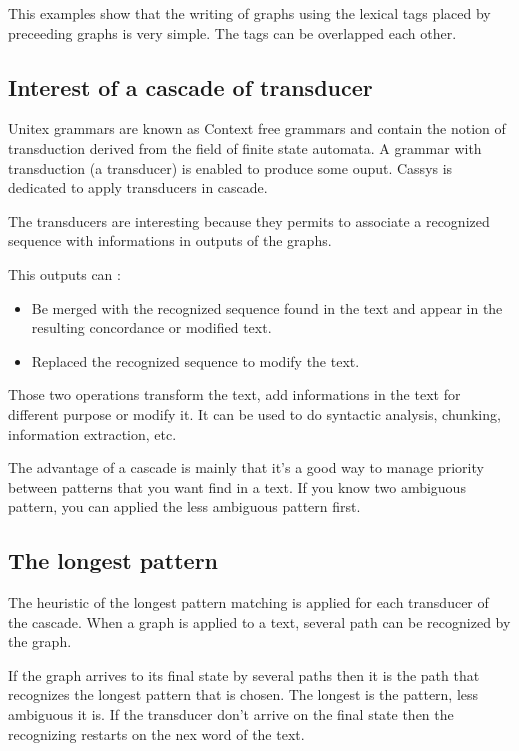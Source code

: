 \bigskip
\noindent This examples show that the writing of graphs using the lexical tags placed by preceeding graphs is very simple. The tags can be overlapped each other.

\subsection{Interest of a cascade of transducer}

Unitex grammars are known as Context free grammars and contain the notion of transduction derived from the field 
of finite state automata. A grammar with transduction (a transducer) is enabled to produce some ouput. 
Cassys is dedicated to apply transducers in cascade.

\bigskip
\noindent The transducers are interesting because they permits to associate a recognized sequence with informations in outputs of the graphs. 

\bigskip
\noindent This outputs can :
\begin{itemize}
	\item	Be merged with the recognized sequence found in the text and appear in the resulting concordance or modified text. 
	\item	Replaced the recognized sequence to modify the text. 
\end{itemize}

\bigskip
\noindent Those two operations transform the text, add informations in the text for different purpose or modify it. It can be used to do syntactic analysis, 
chunking, information extraction, etc. 

\bigskip
\noindent The advantage of a cascade is mainly that it's a good way to manage priority between patterns that you want find in a text. If you know two ambiguous pattern, you can applied the less ambiguous pattern first.

\subsection{The longest pattern}

The heuristic of the longest pattern matching is applied for each transducer of the cascade. When a graph is applied to a text, several path can be recognized
by the graph. 

\bigskip
\noindent If the graph arrives to its final state by several paths then it is the path that recognizes the longest pattern that is chosen. The longest is
the pattern, less ambiguous it is.
If the transducer don't arrive on the final state then the recognizing restarts on the nex word of the text.


